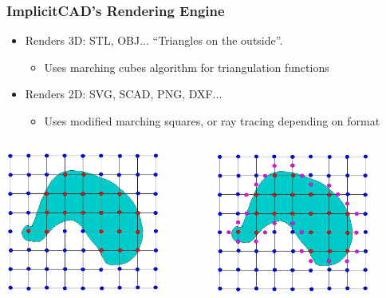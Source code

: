 \documentclass{beamer}
\begin{document}
\begin{frame}
\frametitle{ImplicitCAD's Rendering Engine}
\begin{itemize}
\item Renders 3D: STL, OBJ... ``Triangles on the outside''.
\begin{itemize}
\item Uses marching cubes algorithm for triangulation functions
\end{itemize}
\item Renders 2D: SVG, SCAD, PNG, DXF...
\begin{itemize}
\item Uses modified marching squares, or ray tracing depending on format
\end{itemize}
\end{itemize}
\begin{columns}
  \begin{column}{0.33\textwidth}
    \includegraphics[width=0.8\textwidth, right]{labeledobj.jpg}
  \end{column}
  \begin{column}{0.33\textwidth}
    \includegraphics[width=0.8\textwidth, center]{purpledobj.jpg}

\end{column}
\end{columns}
\end{frame}
\end{document}
